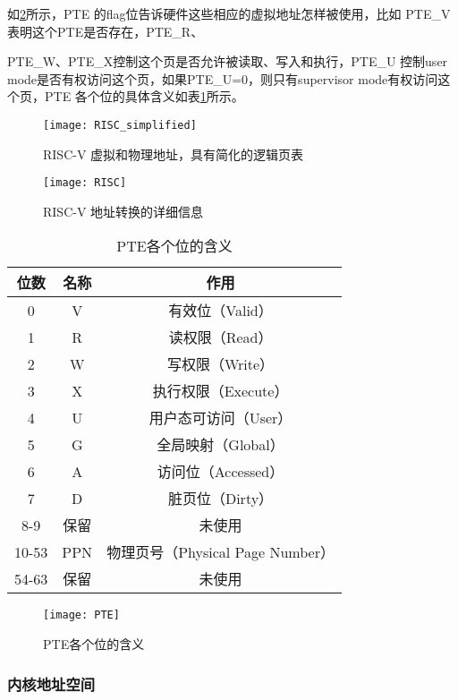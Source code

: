 如\cref{fig:RISC}所示，PTE 的flag位告诉硬件这些相应的虚拟地址怎样被使用，比如 PTE\_V 表明这个PTE是否存在，PTE\_R、{PTE\_W、PTE\_X控制这个页是否允许被读取、写入和执行，PTE\_U 控制user mode是否有权访问这个页，如果PTE\_U=0，则只有supervisor mode有权访问这个页，PTE 各个位的具体含义如表\cref{tab:pte-bits}所示。

\begin{figure}[!htb]
	\centering
	\texttt{[image: RISC\_simplified]}
	\caption{RISC-V 虚拟和物理地址，具有简化的逻辑页表}
	\label{fig:RISC_simplified}
\end{figure}

\begin{figure}[!htb]
	\centering
	\texttt{[image: RISC]}
	\caption{RISC-V 地址转换的详细信息}
	\label{fig:RISC}
\end{figure}

\begin{table}[!hpt]
	\caption{PTE各个位的含义}
	\label{tab:pte-bits}
	\centering
	\begin{tabular}{@{}ccc@{}} \toprule
		\textbf{位数} & \textbf{名称} & \textbf{作用} \\ 
		\midrule
		0   & V  & 有效位（Valid） \\
		1   & R  & 读权限（Read） \\
		2   & W  & 写权限（Write） \\
		3   & X  & 执行权限（Execute） \\
		4   & U  & 用户态可访问（User） \\
		5   & G  & 全局映射（Global） \\
		6   & A  & 访问位（Accessed） \\
		7   & D  & 脏页位（Dirty） \\
		8-9   & 保留 & 未使用 \\
		10-53 & PPN & 物理页号（Physical Page Number） \\
		54-63 & 保留 & 未使用 \\
		\bottomrule
	\end{tabular}
\end{table}

\begin{figure}[!htb]
	\centering
	\texttt{[image: PTE]}
	\caption{PTE各个位的含义}
	\label{fig:PTE}
\end{figure}

\subsubsection{内核地址空间}

}
